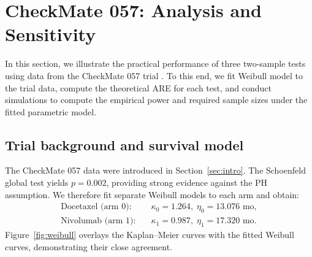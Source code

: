 \documentclass[12pt]{article}
\newcommand{\SchoenfeldPCM}{0.002}
\newcommand{\WeibullShapeControl}{1.264}
\newcommand{\WeibullScaleControl}{13.076}
\newcommand{\WeibullShapeTreatment}{0.987}
\newcommand{\WeibullScaleTreatment}{17.320}
\begin{document}
\begin{table}[ht]
\centering
\caption{ARE and ERE for monotone non-PH patterns; $\tau=40$, $S_0(40)=0.50$, $t_M=43$, $n=400$ per arm, $B=2000$.}
\label{tab:main-sim-nonph}
\end{table}

\section{CheckMate 057: Analysis and Sensitivity}
\label{sec:cm057-analysis}

In this section, we illustrate the practical performance of three two-sample tests using data from the CheckMate 057 trial
\citep{Borghaei2015}.
To this end, we fit Weibull model to the trial data, compute the
theoretical ARE for each test, and conduct simulations to compute the empirical power and required sample sizes under the fitted parametric model.

\subsection{Trial background and survival model}
\label{sec:cm057-background}

The CheckMate 057 data were introduced in Section~\ref{sec:intro}.
The Schoenfeld global test yields $p = \SchoenfeldPCM$, providing strong evidence against
the PH assumption. We therefore fit separate Weibull models to each arm and obtain:
\begin{align*}
  \text{Docetaxel (arm 0):} &\quad \kappa_0=\WeibullShapeControl,\; \eta_0=\WeibullScaleControl\text{ mo}, \\
  \text{Nivolumab (arm 1):} &\quad \kappa_1=\WeibullShapeTreatment,\; \eta_1=\WeibullScaleTreatment\text{ mo}.
\end{align*}
Figure~\ref{fig:weibull} overlays the Kaplan--Meier curves with the fitted Weibull curves, demonstrating their close agreement.
\end{document}

